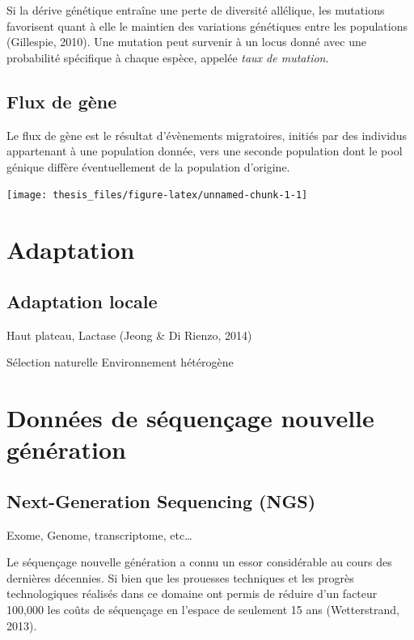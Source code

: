 \documentclass[12pt,twoside]{ugathesis}
\begin{document}
Si la dérive génétique entraîne une perte de diversité allélique, les
mutations favorisent quant à elle le maintien des variations génétiques
entre les populations (Gillespie, 2010). Une mutation peut survenir à un
locus donné avec une probabilité spécifique à chaque espèce, appelée
\emph{taux de mutation}.

\subsection{Flux de gène}\label{flux-de-gene}

Le flux de gène est le résultat d'évènements migratoires, initiés par
des individus appartenant à une population donnée, vers une seconde
population dont le pool génique diffère éventuellement de la population
d'origine.
\begin{center}\texttt{[image: thesis\_files/figure-latex/unnamed-chunk-1-1]} \end{center}

\section{Adaptation}\label{adaptation}

\subsection{Adaptation locale}\label{adaptation-locale}

Haut plateau, Lactase (Jeong \& Di Rienzo, 2014)

Sélection naturelle Environnement hétérogène

\section{Données de séquençage nouvelle
génération}\label{donnees-de-sequencage-nouvelle-generation}

\subsection{Next-Generation Sequencing
(NGS)}\label{next-generation-sequencing-ngs}

Exome, Genome, transcriptome, etc\ldots{}

Le séquençage nouvelle génération a connu un essor considérable au cours
des dernières décennies. Si bien que les prouesses techniques et les
progrès technologiques réalisés dans ce domaine ont permis de réduire
d'un facteur 100,000 les coûts de séquençage en l'espace de seulement 15
ans (Wetterstrand, 2013).
\end{document}
